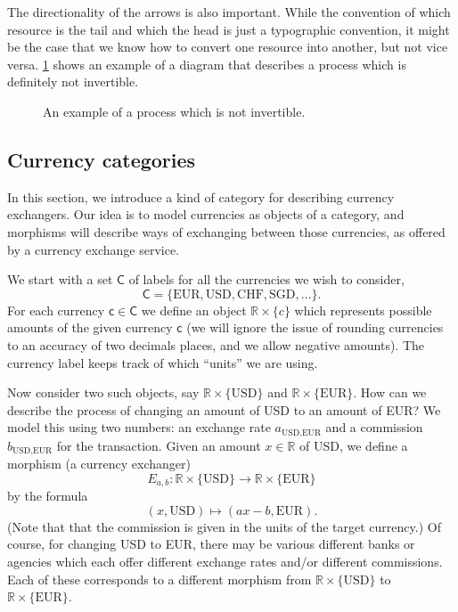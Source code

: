The directionality of the arrows is also important. While the convention of
which resource is the tail and which the head is just a typographic convention,
it might be the case that we know how to convert one resource into another, but
not vice versa. \cref{fig:e10} shows an example of a diagram that describes a process which is definitely
not invertible.

\begin{figure}[h!]
    \centering
    \caption{An example of a process which is not invertible. \label{fig:e10}}
\end{figure}

\subsection{Currency categories}
In this section, we introduce a kind of category for describing currency exchangers. Our idea is to model currencies as objects of a category, and morphisms will describe ways of exchanging between those currencies,  as offered by a currency exchange service. 

We start with a set $\mathsf{C}$ of labels for all the currencies we wish to consider,  
$$\mathsf{C} = \{ \text{EUR}, \text{USD}, \text{CHF}, \text{SGD}, ... \}.$$
For each currency $\mathsf{c} \in \mathsf{C}$ we define an object $\mathbb{R} \times \{c\}$ which represents possible amounts of the given currency $\mathsf{c}$ (we will ignore the issue of rounding currencies to an accuracy of two decimals places, and we allow negative amounts). The currency label keeps track of which ``units'' we are using.

Now consider two such objects, say $\mathbb{R} \times \{\text{USD}\}$ and $\mathbb{R} \times \{\text{EUR}\}$. How can we describe the process of changing an amount of USD to an amount of EUR? We model this using two numbers: an exchange rate $a_{\text{USD}, \text{EUR}}$ and a commission $b_{\text{USD}, \text{EUR}}$ for the transaction. Given an amount $x \in \mathbb{R}$ of USD, we define a morphism (a currency exchanger)
$$
E_{a,b} : \mathbb{R} \times \{\text{USD}\} \rightarrow \mathbb{R} \times \{\text{EUR}\}
$$
by the formula
$$
(x, \text{USD}) \longmapsto (ax - b, \text{EUR}). 
$$
(Note that that the commission is given in the units of the target currency.) Of course, for changing USD to EUR, there may be various different banks or agencies which each offer different exchange rates and/or different commissions. Each of these corresponds to a different morphism from $\mathbb{R} \times \{\text{USD}\}$ to $\mathbb{R} \times \{\text{EUR}\}$.

